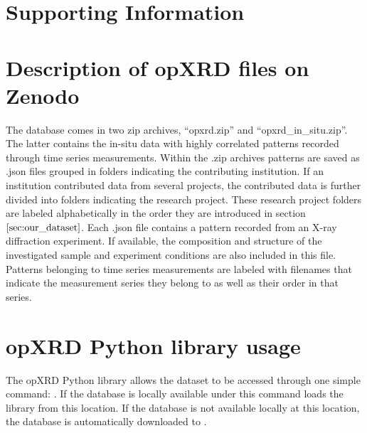 \documentclass[a4paper]{article}
\begin{document}
\printnomenclature

\clearpage




\setcounter{section}{0}
\renewcommand{\thesection}{S\arabic{section}}
\setcounter{figure}{0}
\renewcommand{\thefigure}{S\arabic{figure}}
\setcounter{table}{0}
\renewcommand{\thetable}{S\arabic{table}}

\section*{Supporting Information}

\section{Description of opXRD files on Zenodo}
The database comes in two zip archives, ``opxrd.zip'' and ``opxrd\_in\_situ.zip''. The latter contains the in-situ data with highly correlated patterns recorded through time series measurements. Within the .zip archives patterns are saved as .json files grouped in folders indicating the contributing institution. If an institution contributed data from several projects, the contributed data is further divided into folders indicating the research project. These research project folders are labeled alphabetically in the order they are introduced in section $\eqref{sec:our_dataset}$. 
Each .json file contains a pattern recorded from an X-ray diffraction experiment. If available, the composition and structure of the investigated sample and experiment conditions are also included in this file. Patterns belonging to time series measurements are labeled with filenames that indicate the measurement series they belong to as well as their order in that series. 


\section{opXRD Python library usage}

The opXRD Python library allows the dataset to be accessed through one simple command: . If the database is locally available under  this command loads the library from this location. If the database is not available locally at this location, the database is automatically downloaded to . 
\end{document}
